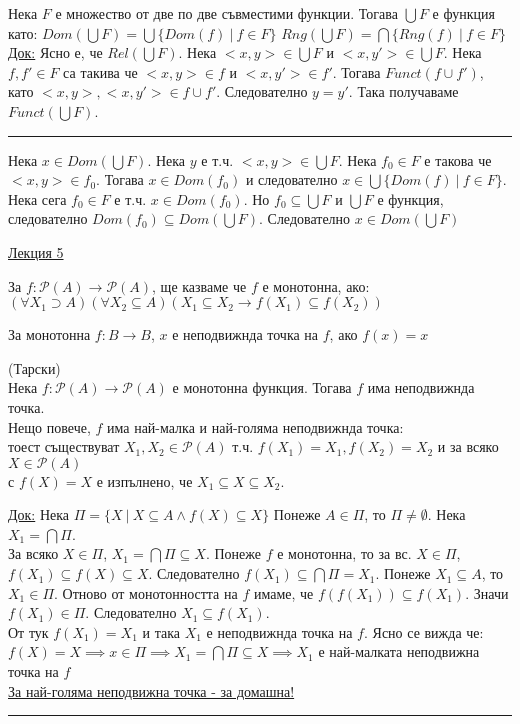 \documentclass[fleqn, titlepage, 12pt]{report}
\begin{document}
 Нека $F$ е множество от две по две съвместими функции. Тогава $ \bigcup F $ е функция като:
$ Dom(\bigcup F) = \bigcup \{Dom(f)\ |\ f \in F\} $
$ Rng(\bigcup F) = \bigcap \{Rng(f)\ |\ f \in F\} $
\bigbreak
\underline{Док:} Ясно е, че $Rel(\bigcup F)$. Нека $<x,y> \in \bigcup F$ и $<x,y'> \in \bigcup F$.
Нека $f, f' \in F$ са такива че $<x,y> \in f$ и $<x,y'> \in f'$. Тогава $Funct(f \cup f')$,
като $<x,y>,<x,y'> \in f \cup f'$. Следователно $y = y'$. Така получаваме $Funct(\bigcup F)$.
\bigbreak
\hrule
\bigbreak

Нека $x \in Dom(\bigcup F)$. Нека $y$ е т.ч. $ <x,y> \in \bigcup F $. Нека $f_0 \in F$ е такова че $<x,y> \in f_0$.
Тогава $x \in Dom(f_0)$ и следователно $x \in \bigcup \{Dom(f)\ |\ f \in F\}$.
Нека сега $f_0 \in F$ е т.ч. $x \in Dom(f_0)$. Но $f_0 \subseteq \bigcup F$ и $ \bigcup F$ е функция, следователно
$Dom(f_0) \subseteq Dom(\bigcup F)$. Следователно $x \in Dom(\bigcup F)$

\begin{center}
  \underline{\huge\normalfont Лекция 5}
\end{center}
\bigbreak

За $f : \mathcal{P}(A) \rightarrow \mathcal{P}(A)$, ще казваме че $f$ е монотонна, ако: \\
$ (\forall{X_1 \supset A})(\forall{X_2 \subseteq A})(X_1 \subseteq X_2 \rightarrow f(X_1) \subseteq f(X_2)) $
\bigbreak

За монотонна $f : B \rightarrow B$, $ x $ е неподвижнда точка на $ f $, ако $f(x) = x$
\bigbreak

 (Тарски)\\
Нека $f: \mathcal{P}(A) \rightarrow \mathcal{P}(A)$ е монотонна функция. Тогава $f$ има неподвижнда точка.\\
Нещо повече, $ f$ има най-малка и най-голяма неподвижнда точка:\\
тоест съществуват $X_1,X_2 \in \mathcal{P}(A)$ т.ч.
$f(X_1) = X_1, f(X_2) = X_2$ и за всяко $X \in \mathcal{P}(A)$\\
с $f(X) = X$ е изпълнено, че $X_1 \subseteq X \subseteq X_2$.
\bigbreak

\underline{Док:} Нека $\Pi = \{X\ |\ X \subseteq A \land f(X) \subseteq X\}$
Понеже $A \in \Pi$, то $\Pi \neq \emptyset$. Нека $X_1 = \bigcap \Pi$.\\
За всяко $X \in \Pi$, $X_1 = \bigcap \Pi \subseteq X$. Понеже $f$ е монотонна,
то за вс. $X \in \Pi$, $f(X_1) \subseteq f(X) \subseteq X$. Следователно $f(X_1) \subseteq \bigcap \Pi = X_1$.
Понеже $X_1 \subseteq A$, то $X_1 \in \Pi$. Отново от монотонността на $f$ имаме, че
$f(f(X_1)) \subseteq f(X_1)$. Значи $f(X_1) \in \Pi$. Следователно $X_1 \subseteq f(X_1)$.\\
От тук $f(X_1) = X_1$ и така $X_1$ е неподвижнда точка на $f$. Ясно се вижда че:\\
$f(X) = X \implies x \in \Pi \implies X_1 = \bigcap \Pi \subseteq X \implies X_1$ е най-малката неподвижна точка на $f$\\
\underline{За най-голяма неподвижна точка - за домашна!}
\bigbreak
\hrule
\bigbreak
\end{document}
